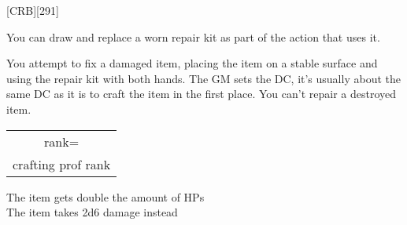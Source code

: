 
[CRB][291]


You can draw and replace a worn repair kit as part of the action that uses it.

You attempt to fix a damaged item, placing the item on a stable surface and using the repair kit with both hands.
The GM sets the DC, it's usually about the same DC as it is to craft the item in the first place.
You can't repair a destroyed item.

 \begin{tabular}{c}rank=\\crafting prof rank\end{tabular}

 The item gets double the amount of HPs \\
 The item takes 2d6 damage instead
\vfill

